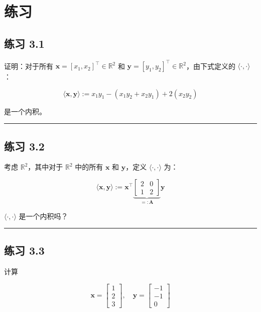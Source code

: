 \chapter*{练习}

\section*{练习 3.1}

证明：对于所有 $ \boldsymbol{x} = [x_1, x_2]^\top \in \mathbb{R}^2 $ 和 $ \boldsymbol{y} = [y_1, y_2]^\top \in \mathbb{R}^2 $，由下式定义的 $ \langle\cdot, \cdot\rangle $：

\begin{equation*}
\langle\boldsymbol{x}, \boldsymbol{y}\rangle := x_1 y_1 - (x_1 y_2 + x_2 y_1) + 2(x_2 y_2)
\end{equation*}

是一个内积。

\medskip\hrule\medskip

\section*{练习 3.2}

考虑 $ \mathbb{R}^2 $，其中对于 $ \mathbb{R}^2 $ 中的所有 $ \boldsymbol{x} $ 和 $ \boldsymbol{y} $，定义 $ \langle\cdot, \cdot\rangle $ 为：

\begin{equation*}
\langle\boldsymbol{x}, \boldsymbol{y}\rangle := \boldsymbol{x}^\top \underbrace{\begin{bmatrix} 2 & 0 \\ 1 & 2 \end{bmatrix}}_{=: \boldsymbol{A}} \boldsymbol{y}
\end{equation*}

$ \langle\cdot, \cdot\rangle $ 是一个内积吗？

\medskip\hrule\medskip

\section*{练习 3.3}

计算

\begin{equation*}
\boldsymbol{x} = \begin{bmatrix} 1 \\ 2 \\ 3 \end{bmatrix}, \quad \boldsymbol{y} = \begin{bmatrix} -1 \\ -1 \\ 0 \end{bmatrix}
\end{equation*}

